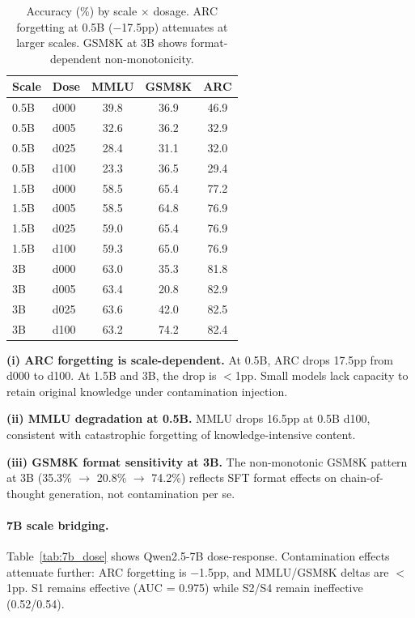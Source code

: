 \documentclass[11pt,a4paper]{article}
\begin{document}
\begin{table}[t]
\centering
\small
\caption{Accuracy (\%) by scale $\times$ dosage. ARC forgetting at 0.5B ($-$17.5pp) attenuates at larger scales. GSM8K at 3B shows format-dependent non-monotonicity.}
\label{tab:dose_response}
\begin{tabular}{llccc}
\toprule
Scale & Dose & MMLU & GSM8K & ARC \\
\midrule
0.5B & d000 & 39.8 & 36.9 & 46.9 \\
0.5B & d005 & 32.6 & 36.2 & 32.9 \\
0.5B & d025 & 28.4 & 31.1 & 32.0 \\
0.5B & d100 & 23.3 & 36.5 & 29.4 \\
\midrule
1.5B & d000 & 58.5 & 65.4 & 77.2 \\
1.5B & d005 & 58.5 & 64.8 & 76.9 \\
1.5B & d025 & 59.0 & 65.4 & 76.9 \\
1.5B & d100 & 59.3 & 65.0 & 76.9 \\
\midrule
3B & d000 & 63.0 & 35.3 & 81.8 \\
3B & d005 & 63.4 & 20.8 & 82.9 \\
3B & d025 & 63.6 & 42.0 & 82.5 \\
3B & d100 & 63.2 & 74.2 & 82.4 \\
\bottomrule
\end{tabular}
\end{table}

\noindent\textbf{(i) ARC forgetting is scale-dependent.} At 0.5B, ARC drops 17.5pp from d000 to d100. At 1.5B and 3B, the drop is $<$1pp. Small models lack capacity to retain original knowledge under contamination injection.

\noindent\textbf{(ii) MMLU degradation at 0.5B.} MMLU drops 16.5pp at 0.5B d100, consistent with catastrophic forgetting of knowledge-intensive content.

\noindent\textbf{(iii) GSM8K format sensitivity at 3B.} The non-monotonic GSM8K pattern at 3B (35.3\% $\to$ 20.8\% $\to$ 74.2\%) reflects SFT format effects on chain-of-thought generation, not contamination per se.

\paragraph{7B scale bridging.} Table~\ref{tab:7b_dose} shows Qwen2.5-7B dose-response. Contamination effects attenuate further: ARC forgetting is $-$1.5pp, and MMLU/GSM8K deltas are $<$1pp. S1 remains effective (AUC = 0.975) while S2/S4 remain ineffective (0.52/0.54).
\end{document}
